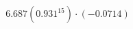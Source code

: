 \documentclass[preview]{standalone}
\begin{document}
\begin{align*}
6.687(0.931^15) \cdot (-0.0714)
\end{align*}
\end{document}
